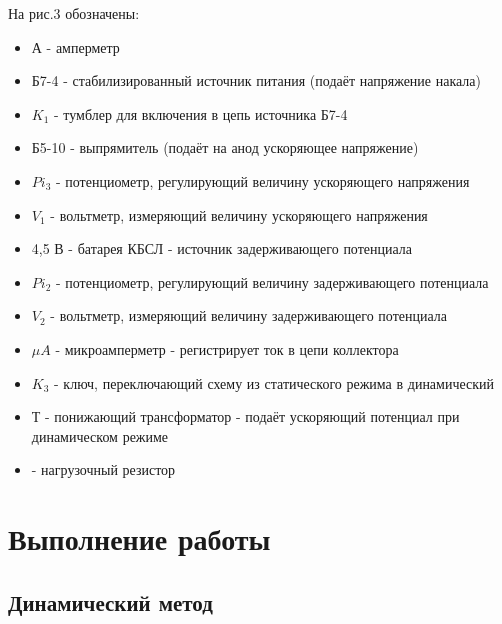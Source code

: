 \documentclass[a4paper, 12pt]{article}%
\begin{document}
На рис.3 обозначены:
\begin{itemize}
    \item А - амперметр
    \item Б7-4 - стабилизированный источник питания (подаёт напряжение накала)
    \item $K_1$ - тумблер для включения в цепь источника Б7-4
    \item Б5-10 - выпрямитель (подаёт на анод ускоряющее напряжение)
    \item $Pi_3$ - потенциометр, регулирующий величину ускоряющего напряжения
    \item $V_1$ - вольтметр, измеряющий величину ускоряющего напряжения
    \item 4,5 В - батарея КБСЛ - источник задерживающего потенциала
    \item $Pi_2$ - потенциометр, регулирующий величину задерживающего потенциала
    \item $V_2$ - вольтметр, измеряющий величину задерживающего потенциала
    \item $\mu A$ - микроамперметр - регистрирует ток в цепи коллектора
    \item $K_3$ - ключ, переключающий схему из статического режима в динамический
    \item Т - понижающий трансформатор - подаёт ускоряющий потенциал при динамическом режиме
    \item - нагрузочный резистор
\end{itemize}

\section{Выполнение работы}

\subsection{Динамический метод}
\end{document}
